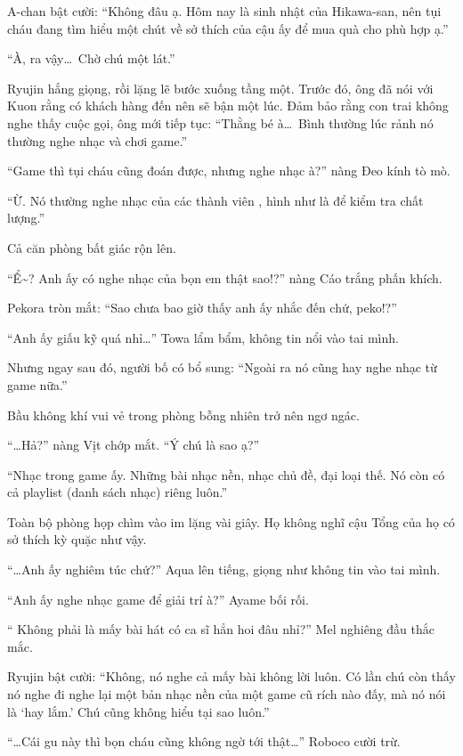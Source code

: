\documentclass[../main.tex]{subfiles}
\begin{document}
A-chan bật cười: ``Không đâu ạ. Hôm nay là sinh nhật của Hikawa-san, nên tụi cháu đang tìm hiểu một chút về sở thích của cậu ấy để mua quà cho phù hợp ạ.''

``À, ra vậy\dots\ Chờ chú một lát.''

Ryujin hắng giọng, rồi lặng lẽ bước xuống tầng một. Trước đó, ông đã nói với Kuon rằng có khách hàng đến nên sẽ bận một lúc. Đảm bảo rằng con trai không nghe thấy cuộc gọi, ông mới tiếp tục: ``Thằng bé à\dots\ Bình thường lúc rảnh nó thường nghe nhạc và chơi game.''

``Game thì tụi cháu cũng đoán được, nhưng nghe nhạc à?'' nàng Đeo kính tò mò.

``Ừ. Nó thường nghe nhạc của các thành viên \hll, hình như là để kiểm tra chất lượng.''

Cả căn phòng bất giác rộn lên.

``Ể\~{}? Anh ấy có nghe nhạc của bọn em thật sao!?'' nàng Cáo trắng phấn khích.

Pekora tròn mắt: ``Sao chưa bao giờ thấy anh ấy nhắc đến chứ, peko!?''

``Anh ấy giấu kỹ quá nhỉ\dots'' Towa lẩm bẩm, không tin nổi vào tai mình.

Nhưng ngay sau đó, người bố có bổ sung: ``Ngoài ra nó cũng hay nghe nhạc từ game nữa.''

Bầu không khí vui vẻ trong phòng bỗng nhiên trở nên ngơ ngác.

``\dots Hả?'' nàng Vịt chớp mắt. ``Ý chú là sao ạ?''

``Nhạc trong game ấy. Những bài nhạc nền, nhạc chủ đề, đại loại thế. Nó còn có cả playlist (danh sách nhạc) riêng luôn.''

Toàn bộ phòng họp chìm vào im lặng vài giây. Họ không nghĩ cậu Tổng của họ có sở thích kỳ quặc như vậy.

``\dots Anh ấy nghiêm túc chứ?'' Aqua lên tiếng, giọng như không tin vào tai mình.

``Anh ấy nghe nhạc game để giải trí à?'' Ayame bối rối.

`` Không phải là mấy bài hát có ca sĩ hẳn hoi đâu nhỉ?'' Mel nghiêng đầu thắc mắc.

Ryujin bật cười: ``Không, nó nghe cả mấy bài không lời luôn. Có lần chú còn thấy nó nghe đi nghe lại một bản nhạc nền của một game cũ rích nào đấy, mà nó nói là `hay lắm.' Chú cũng không hiểu tại sao luôn.''

``\dots Cái gu này thì bọn cháu cũng không ngờ tới thật\dots'' Roboco cười trừ.
\end{document}
